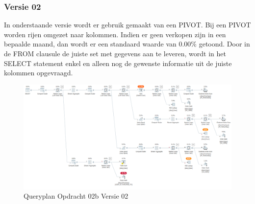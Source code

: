 \subsubsection{Versie 02}
In onderstaande versie wordt er gebruik gemaakt van een PIVOT. Bij een PIVOT worden rijen omgezet naar kolommen. Indien er geen verkopen
zijn in een bepaalde maand, dan wordt er een standaard waarde van 0.00\% getoond. Door in de FROM clausule de juiste set met gegevens
aan te leveren, wordt in het SELECT statement enkel en alleen nog de gewenste informatie uit de juiste kolommen opgevraagd.

\begin{figure}[H]
    \centering
    \includegraphics[width=1\textwidth]{image/marc/opdracht-02b.PNG}
    \caption{Queryplan Opdracht 02b Versie 02}
\end{figure}

